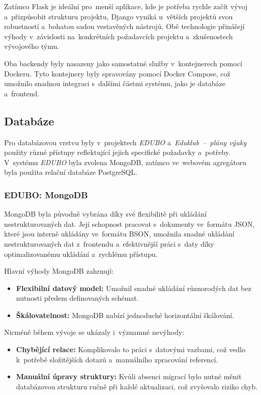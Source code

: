 \documentclass[male,czech,api_bc]{kitheses}
\begin{document}
Zatímco Flask je ideální pro~menší aplikace, kde je potřeba rychle začít vývoj a~přizpůsobit strukturu projektu, Django vyniká u~větších projektů svou robustností a~bohatou sadou vestavěných nástrojů. Obě technologie přinášejí výhody v~závislosti na~konkrétních požadavcích projektu a~zkušenostech vývojového týmu.

Oba backendy byly nasazeny jako samostatné služby v~kontejnerech pomocí Dockeru. Tyto kontejnery byly spravovány pomocí Docker Compose, což umožnilo snadnou integraci s~dalšími částmi systému, jako je databáze a~frontend.

\subsection{Databáze}

Pro databázovou vrstvu byly v~projektech \textit{EDUBO} a~\textit{Eduklub~--~plány výuky} použity různé přístupy reflektující jejich specifické požadavky a~potřeby. V~systému \textit{EDUBO} byla zvolena MongoDB, zatímco ve~webovém agregátoru byla použita relační databáze PostgreSQL.

\subsubsection{EDUBO: MongoDB}

MongoDB byla původně vybrána díky své flexibilitě při ukládání nestrukturovaných dat. Její schopnost pracovat s~dokumenty ve~formátu JSON, které jsou interně ukládány ve~formátu BSON, umožnila snadné ukládání nestrukturovaných dat z~frontendu a~efektivnější práci s~daty díky optimalizovanému ukládání a~rychlému přístupu.

Hlavní výhody MongoDB zahrnují:
\begin{itemize}
	\item \textbf{Flexibilní datový model:} Umožnil snadné ukládání různorodých dat bez nutnosti předem definovaných schémat.
	\item \textbf{Škálovatelnost:} MongoDB nabízí jednoduché horizontální škálování.
\end{itemize}

Nicméně během vývoje se ukázaly i~významné nevýhody:
\begin{itemize}
	\item \textbf{Chybějící relace:} Komplikovalo to práci s~datovými vazbami, což vedlo k~potřebě složitějších dotazů a~manuálního zpracování referencí.
	\item \textbf{Manuální úpravy struktury:} Kvůli absenci migrací bylo nutné měnit databázovou strukturu ručně při každé aktualizaci, což zvyšovalo riziko chyb.
\end{itemize}
\end{document}
